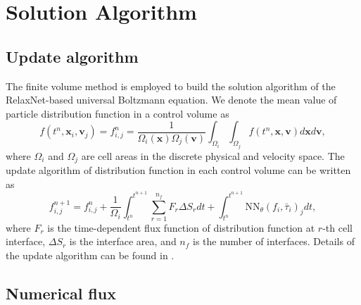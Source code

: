 \documentclass[preprint,3p,12pt,sort&compress]{elsarticle}
\begin{document}
\section{Solution Algorithm}\label{sec:algorithm}

\subsection{Update algorithm}

The finite volume method is employed to build the solution algorithm of the RelaxNet-based universal Boltzmann equation.
We denote the mean value of particle distribution function in a control volume as
\begin{equation}
    f(t^n,\mathbf x_i,\mathbf v_j)=f_{i,j}^n=\frac{1}{\Omega_{i}(\mathbf x)\Omega_{j}(\mathbf v)} \int_{\Omega_{i}} \int_{\Omega_{j}} f(t^n,\mathbf x,\mathbf v) d\mathbf xd\mathbf v,
\end{equation}
where $\Omega_{i}$ and $\Omega_{j}$ are cell areas in the discrete physical and velocity space.
The update algorithm of distribution function in each control volume can be written as
\begin{equation}
    f_{i,j}^{n+1}=f_{i,j}^n+\frac{1}{\Omega_{i}}\int_{t^n}^{t^{n+1}} \sum_{r=1}^{n_f} F_r \Delta S_r dt+ \int_{t^n}^{t^{n+1}} \mathrm{NN}_\theta(f_{i},\bar\tau_i)_j dt,
    \label{eqn:update}
\end{equation}
where $F_r$ is the time-dependent flux function of distribution function at $r$-th cell interface, $\Delta  S_r$ is the interface area, and $n_f$ is the number of interfaces.
Details of the update algorithm can be found in \cite{xiao2021stochastic}.

\subsection{Numerical flux}
\end{document}
